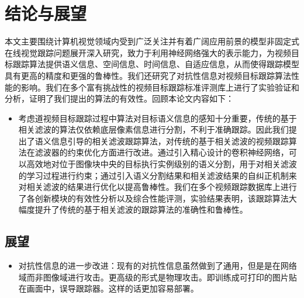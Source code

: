 \chapter{结论与展望}\label{chap:conclusion}
本文主要围绕计算机视觉领域内受到广泛关注并有着广阔应用前景的模型非固定式在线视觉跟踪问题展开深入研究，致力于利用神经网络强大的表示能力，为视频目标跟踪算法提供语义信息、空间信息、时间信息、自适应信息，从而使得跟踪模型具有更高的精度和更强的鲁棒性。我们还研究了对抗性信息对视频目标跟踪算法性能的影响。我们在多个富有挑战性的视频目标跟踪标准评测库上进行了实验验证和分析，证明了我们提出的算法的有效性。回顾本论文内容如下：
\begin{itemize}
\item 考虑道视频目标跟踪过程中算法对目标语义信息的感知十分重要，传统的基于相关滤波的算法仅依赖底层像素信息进行分割，不利于准确跟踪。因此我们提出了语义信息引导的相关滤波跟踪算法，对传统的基于相关滤波的视频跟踪算法在滤波器的约束优化方面进行改进。通过引入精心设计的卷积神经网络，可以高效地对位于图像块中央的目标执行实例级别的语义分割，用于对相关滤波的学习过程进行约束；通过引入语义分割结果和相关滤波结果的自纠正机制来对相关滤波的结果进行优化以提高鲁棒性。我们在多个视频跟踪数据库上进行了各创新模块的有效性分析以及综合性能评测，实验结果表明，该跟踪算法大幅度提升了传统的基于相关滤波的跟踪算法的准确性和鲁棒性。
\end{itemize}
\section{展望}
\begin{itemize}
\item 对抗性信息的进一步改进：现有的对抗性信息虽然做到了通用，但是是在网络域而非图像域进行攻击。更高级的形式是物理攻击。即训练成可打印的图片贴在画面中，误导跟踪器。这样的话更加容易部署。
\end{itemize}